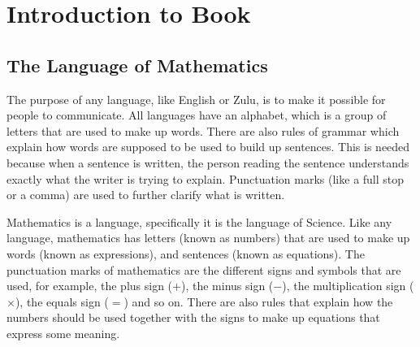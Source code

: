 \chapter{Introduction to Book}
\label{mathintro}

\section{The Language of Mathematics}
The purpose of any language, like English or Zulu, is to make it possible for people to communicate. All languages have an alphabet, which is a group of letters that are used to make up words. There are also rules of grammar which explain how words are supposed to be used to build up sentences. This is needed because when a sentence is written, the person reading the sentence understands exactly what the writer is trying to explain. Punctuation marks (like a full stop or a comma) are used to further clarify what is written.

Mathematics is a language, specifically it is the language of Science. Like any language, mathematics has letters (known as numbers) that are used to make up words (known as expressions), and sentences (known as equations). The punctuation marks of mathematics are the different signs and symbols that are used, for example, the plus sign ($+$), the minus sign ($-$), the multiplication sign ($\times$), the equals sign ($=$) and so on. There are also rules that explain how the numbers should be used together with the signs to make up equations that express some meaning.

